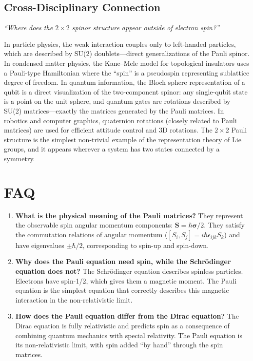 \subsection*{Cross-Disciplinary Connection}
\textit{``Where does the $2 \times 2$ spinor structure appear outside of electron spin?''}

In particle physics, the weak interaction couples only to left-handed particles, which are described by SU(2) doublets---direct generalizations of the Pauli spinor. In condensed matter physics, the Kane--Mele model for topological insulators uses a Pauli-type Hamiltonian where the ``spin'' is a pseudospin representing sublattice degree of freedom. In quantum information, the Bloch sphere representation of a qubit is a direct visualization of the two-component spinor: any single-qubit state is a point on the unit sphere, and quantum gates are rotations described by SU(2) matrices---exactly the matrices generated by the Pauli matrices. In robotics and computer graphics, quaternion rotations (closely related to Pauli matrices) are used for efficient attitude control and 3D rotations. The $2 \times 2$ Pauli structure is the simplest non-trivial example of the representation theory of Lie groups, and it appears wherever a system has two states connected by a symmetry.

\section*{FAQ}

\begin{enumerate}
\item \textbf{What is the physical meaning of the Pauli matrices?}
They represent the observable spin angular momentum components: $\mathbf{S} = \hbar\boldsymbol{\sigma}/2$. They satisfy the commutation relations of angular momentum ($[S_{i}, S_{j}] = i\hbar\epsilon_{ijk}S_{k}$) and have eigenvalues $\pm\hbar/2$, corresponding to spin-up and spin-down.

\item \textbf{Why does the Pauli equation need spin, while the Schrödinger equation does not?}
The Schrödinger equation describes spinless particles. Electrons have spin-1/2, which gives them a magnetic moment. The Pauli equation is the simplest equation that correctly describes this magnetic interaction in the non-relativistic limit.

\item \textbf{How does the Pauli equation differ from the Dirac equation?}
The Dirac equation is fully relativistic and predicts spin as a consequence of combining quantum mechanics with special relativity. The Pauli equation is its non-relativistic limit, with spin added ``by hand'' through the spin matrices.
\end{enumerate}
